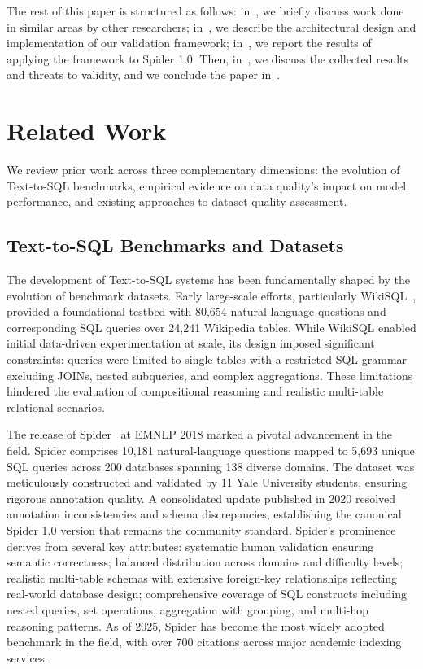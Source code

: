 \documentclass[]{einformatica}
\begin{document}
The rest of this paper is structured as follows: in~, we briefly discuss work done in similar areas by other researchers; in~, we describe the architectural design and implementation of our validation framework; in~, we report the results of applying the framework to Spider 1.0. Then, in~, we discuss the collected results and threats to validity, and we conclude the paper in~.

\section{Related Work}\label{sec:RelatedWork}

We review prior work across three complementary dimensions: the evolution of Text-to-SQL benchmarks, empirical evidence on data quality's impact on model performance, and existing approaches to dataset quality assessment.

\subsection{Text-to-SQL Benchmarks and Datasets}

The development of Text-to-SQL systems has been fundamentally shaped by the evolution of benchmark datasets. Early large-scale efforts, particularly WikiSQL~\cite{zhong2017seq2sql}, provided a foundational testbed with 80,654 natural-language questions and corresponding SQL queries over 24,241 Wikipedia tables. While WikiSQL enabled initial data-driven experimentation at scale, its design imposed significant constraints: queries were limited to single tables with a restricted SQL grammar excluding JOINs, nested subqueries, and complex aggregations. These limitations hindered the evaluation of compositional reasoning and realistic multi-table relational scenarios.

The release of Spider~\cite{yu2018spider} at EMNLP 2018 marked a pivotal advancement in the field. Spider comprises 10,181 natural-language questions mapped to 5,693 unique SQL queries across 200 databases spanning 138 diverse domains. The dataset was meticulously constructed and validated by 11 Yale University students, ensuring rigorous annotation quality. A consolidated update published in 2020 resolved annotation inconsistencies and schema discrepancies, establishing the canonical Spider 1.0 version that remains the community standard. Spider's prominence derives from several key attributes: systematic human validation ensuring semantic correctness; balanced distribution across domains and difficulty levels; realistic multi-table schemas with extensive foreign-key relationships reflecting real-world database design; comprehensive coverage of SQL constructs including nested queries, set operations, aggregation with grouping, and multi-hop reasoning patterns. As of 2025, Spider has become the most widely adopted benchmark in the field, with over 700 citations across major academic indexing services.
\end{document}
